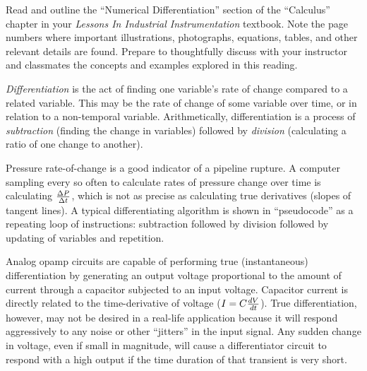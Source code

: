 

Read and outline the ``Numerical Differentiation'' section of the ``Calculus'' chapter in your {\it Lessons In Industrial Instrumentation} textbook.  Note the page numbers where important illustrations, photographs, equations, tables, and other relevant details are found.  Prepare to thoughtfully discuss with your instructor and classmates the concepts and examples explored in this reading.














{\it Differentiation} is the act of finding one variable's rate of change compared to a related variable.  This may be the rate of change of some variable over time, or in relation to a non-temporal variable.  Arithmetically, differentiation is a process of {\it subtraction} (finding the change in variables) followed by {\it division} (calculating a ratio of one change to another).

\vskip 10pt

Pressure rate-of-change is a good indicator of a pipeline rupture.  A computer sampling every so often to calculate rates of pressure change over time is calculating $\Delta P \over \Delta t$, which is not as precise as calculating true derivatives (slopes of tangent lines).  A typical differentiating algorithm is shown in ``pseudocode'' as a repeating loop of instructions: subtraction followed by division followed by updating of variables and repetition.

Analog opamp circuits are capable of performing true (instantaneous) differentiation by generating an output voltage proportional to the amount of current through a capacitor subjected to an input voltage.  Capacitor current is directly related to the time-derivative of voltage ($I = C {dV \over dt}$).  True differentiation, however, may not be desired in a real-life application because it will respond aggressively to any noise or other ``jitters'' in the input signal.  Any sudden change in voltage, even if small in magnitude, will cause a differentiator circuit to respond with a high output if the time duration of that transient is very short.

